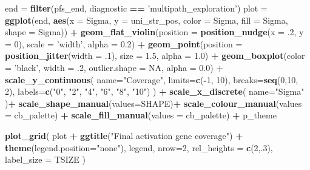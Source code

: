 \documentclass[]{book}
\newenvironment{Shaded}{\begin{snugshade}}{\end{snugshade}}
\newcommand{\DataTypeTok}[1]{\textcolor[rgb]{0.13,0.29,0.53}{#1}}
\newcommand{\DecValTok}[1]{\textcolor[rgb]{0.00,0.00,0.81}{#1}}
\newcommand{\FloatTok}[1]{\textcolor[rgb]{0.00,0.00,0.81}{#1}}
\newcommand{\KeywordTok}[1]{\textcolor[rgb]{0.13,0.29,0.53}{\textbf{#1}}}
\newcommand{\NormalTok}[1]{#1}
\newcommand{\OperatorTok}[1]{\textcolor[rgb]{0.81,0.36,0.00}{\textbf{#1}}}
\newcommand{\OtherTok}[1]{\textcolor[rgb]{0.56,0.35,0.01}{#1}}
\newcommand{\StringTok}[1]{\textcolor[rgb]{0.31,0.60,0.02}{#1}}
\begin{document}
\begin{Shaded}
\begin{Highlighting}[]
\NormalTok{end =}\StringTok{ }\KeywordTok{filter}\NormalTok{(pfs_end, diagnostic }\OperatorTok{==}\StringTok{ 'multipath_exploration'}\NormalTok{)}
\NormalTok{plot =}\StringTok{ }\KeywordTok{ggplot}\NormalTok{(end, }\KeywordTok{aes}\NormalTok{(}\DataTypeTok{x =}\NormalTok{ Sigma, }\DataTypeTok{y =}\NormalTok{ uni_str_pos, }\DataTypeTok{color =}\NormalTok{ Sigma, }\DataTypeTok{fill =}\NormalTok{ Sigma, }\DataTypeTok{shape =}\NormalTok{ Sigma)) }\OperatorTok{+}
\StringTok{  }\KeywordTok{geom_flat_violin}\NormalTok{(}\DataTypeTok{position =} \KeywordTok{position_nudge}\NormalTok{(}\DataTypeTok{x =} \FloatTok{.2}\NormalTok{, }\DataTypeTok{y =} \DecValTok{0}\NormalTok{), }\DataTypeTok{scale =} \StringTok{'width'}\NormalTok{, }\DataTypeTok{alpha =} \FloatTok{0.2}\NormalTok{) }\OperatorTok{+}
\StringTok{  }\KeywordTok{geom_point}\NormalTok{(}\DataTypeTok{position =} \KeywordTok{position_jitter}\NormalTok{(}\DataTypeTok{width =} \FloatTok{.1}\NormalTok{), }\DataTypeTok{size =} \FloatTok{1.5}\NormalTok{, }\DataTypeTok{alpha =} \FloatTok{1.0}\NormalTok{) }\OperatorTok{+}
\StringTok{  }\KeywordTok{geom_boxplot}\NormalTok{(}\DataTypeTok{color =} \StringTok{'black'}\NormalTok{, }\DataTypeTok{width =} \FloatTok{.2}\NormalTok{, }\DataTypeTok{outlier.shape =} \OtherTok{NA}\NormalTok{, }\DataTypeTok{alpha =} \FloatTok{0.0}\NormalTok{) }\OperatorTok{+}
\StringTok{  }\KeywordTok{scale_y_continuous}\NormalTok{(}
    \DataTypeTok{name=}\StringTok{"Coverage"}\NormalTok{,}
    \DataTypeTok{limits=}\KeywordTok{c}\NormalTok{(}\OperatorTok{-}\DecValTok{1}\NormalTok{, }\DecValTok{10}\NormalTok{),}
    \DataTypeTok{breaks=}\KeywordTok{seq}\NormalTok{(}\DecValTok{0}\NormalTok{,}\DecValTok{10}\NormalTok{, }\DecValTok{2}\NormalTok{),}
    \DataTypeTok{labels=}\KeywordTok{c}\NormalTok{(}\StringTok{"0"}\NormalTok{, }\StringTok{"2"}\NormalTok{, }\StringTok{"4"}\NormalTok{, }\StringTok{"6"}\NormalTok{, }\StringTok{"8"}\NormalTok{, }\StringTok{"10"}\NormalTok{)}
\NormalTok{  ) }\OperatorTok{+}
\StringTok{  }\KeywordTok{scale_x_discrete}\NormalTok{(}
    \DataTypeTok{name=}\StringTok{"Sigma"}
\NormalTok{  )}\OperatorTok{+}
\StringTok{  }\KeywordTok{scale_shape_manual}\NormalTok{(}\DataTypeTok{values=}\NormalTok{SHAPE)}\OperatorTok{+}
\StringTok{  }\KeywordTok{scale_colour_manual}\NormalTok{(}\DataTypeTok{values =}\NormalTok{ cb_palette) }\OperatorTok{+}
\StringTok{  }\KeywordTok{scale_fill_manual}\NormalTok{(}\DataTypeTok{values =}\NormalTok{ cb_palette) }\OperatorTok{+}
\StringTok{  }\NormalTok{p_theme}

\KeywordTok{plot_grid}\NormalTok{(}
\NormalTok{  plot }\OperatorTok{+}
\StringTok{    }\KeywordTok{ggtitle}\NormalTok{(}\StringTok{"Final activation gene coverage"}\NormalTok{) }\OperatorTok{+}
\StringTok{    }\KeywordTok{theme}\NormalTok{(}\DataTypeTok{legend.position=}\StringTok{"none"}\NormalTok{),}
\NormalTok{  legend,}
  \DataTypeTok{nrow=}\DecValTok{2}\NormalTok{,}
  \DataTypeTok{rel_heights =} \KeywordTok{c}\NormalTok{(}\DecValTok{2}\NormalTok{,.}\DecValTok{3}\NormalTok{),}
  \DataTypeTok{label_size =}\NormalTok{ TSIZE}
\NormalTok{)}
\end{Highlighting}
\end{Shaded}
\end{document}
